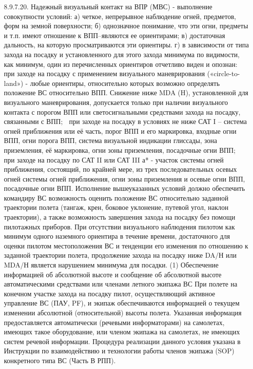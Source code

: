 8.9.7.20.	Надежный визуальный контакт на ВПР (МВС) - выполнение совокупности условий:
а)	четкое, непрерывное наблюдение огней, предметов, форм на земной поверхности;
б)	однозначное понимание, что эти огни, предметы и т.п. имеют отношение к ВПП–являются ее ориентирами;
в)	достаточная дальность, на которую просматриваются эти ориентиры.
г)	в зависимости от типа захода на посадку и установленного для этого захода минимума по видимости, как минимум, один из перечисленных ориентиров отчетливо виден и опознан:
	при заходе на посадку с применением визуального маневрирования («circle-to-land») - любые ориентиры, относительно которых возможно определять положение ВС относительно ВПП.
Снижение ниже MDA (H), установленной для визуального маневрирования, допускается только при наличии визуального контакта с порогом ВПП или светосигнальными средствами захода на посадку, связанными с ВПП;
	при заходе на посадку в условиях не ниже САТ I – система огней приближения или её часть, порог ВПП и его маркировка, входные огни ВПП, огни порога ВПП, система визуальной индикации глиссады, зона приземления, её маркировка, огни зоны приземления, посадочные огни ВПП;
	при заходе на посадку по САТ II или САТ III а* - участок системы огней приближения, состоящий, по крайней мере, из трех последовательных осевых огней системы огней приближения, огни зоны приземления и осевые огни ВПП, посадочные огни ВПП.
Исполнение вышеуказанных условий должно обеспечить командиру ВС возможность оценить положение ВС относительно заданной траектории полета (тангаж, крен, боковое уклонение, путевой угол, наклон траектории), а также возможность завершения захода на посадку без помощи пилотажных приборов.
При отсутствии визуального наблюдения пилотом как минимум одного наземного ориентира в течение времени, достаточного для оценки пилотом местоположения ВС и тенденции его изменения по отношению к заданной траектории полета, продолжение захода на посадку ниже DA/Н или MDA/Н является нарушением минимума для посадки.
(1) Обеспечение информацией об абсолютной высоте и сообщение об абсолютной высоте автоматическими средствами или членами летного экипажа ВС
При полете на конечном участке захода на посадку пилот, осуществляющий активное управление ВС (ПАУ, PF), и экипаж обеспечиваются информацией о текущем изменении абсолютной (относительной) высоты полета. Указанная информация предоставляется автоматически (речевыми информаторами) на самолетах, имеющих такое оборудование, или членом экипажа на самолетах, не имеющих систем речевой информации. Процедура реализации данного условия указана в Инструкции по взаимодействию и технологии работы членов экипажа (SOP) конкретного типа ВС (Часть В РПП).
